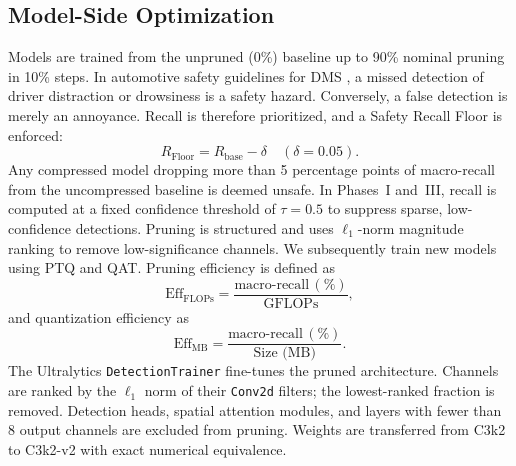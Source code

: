 \documentclass[conference]{IEEEtran}
\begin{document}
\subsection{Model-Side Optimization}
Models are trained from the unpruned (0\%) baseline up to 90\% nominal pruning in 10\% steps. In automotive safety guidelines for DMS \cite{euroncap2026driver,isots5283}, a missed detection of driver distraction or drowsiness is a safety hazard. Conversely, a false detection is merely an annoyance. Recall is therefore prioritized, and a Safety Recall Floor is enforced:
\[
R_{\text{Floor}} = R_{\text{base}} - \delta\quad(\delta=0.05).
\]
Any compressed model dropping more than 5 percentage points of macro-recall from the uncompressed baseline is deemed unsafe. In Phases~I and~III, recall is computed at a fixed confidence threshold of $\tau=0.5$ to suppress sparse, low-confidence detections. Pruning is structured and uses $\ell_1$-norm magnitude ranking to remove low-significance channels. We subsequently train new models using PTQ and QAT. Pruning efficiency is defined as
\[
\text{Eff}_{\text{FLOPs}} = \frac{\text{macro-recall}\,(\%)}{\text{GFLOPs}},
\]
and quantization efficiency as
\[
\text{Eff}_{\text{MB}} = \frac{\text{macro-recall}\,(\%)}{\text{Size (MB)}}.
\]
The Ultralytics \texttt{DetectionTrainer} fine-tunes the pruned architecture. Channels are ranked by the $\ell_1$ norm of their \texttt{Conv2d} filters; the lowest-ranked fraction is removed. Detection heads, spatial attention modules, and layers with fewer than 8 output channels are excluded from pruning. Weights are transferred from C3k2 to C3k2-v2 with exact numerical equivalence.
\end{document}
